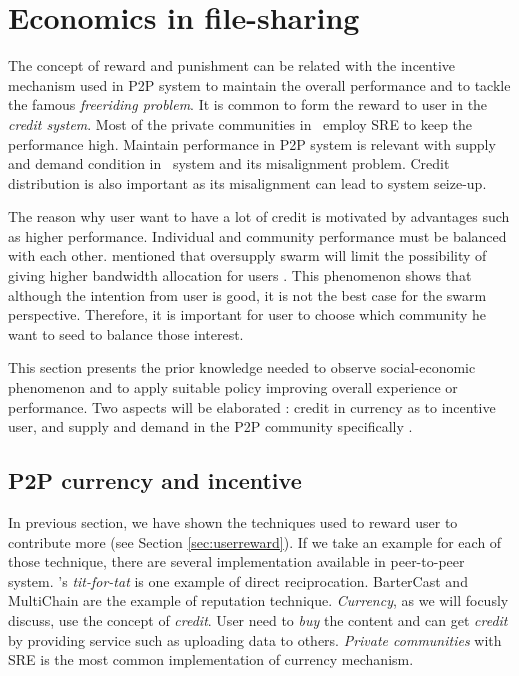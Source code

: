 \section{Economics in file-sharing}
The concept of reward and punishment can be related with the incentive mechanism used in P2P system to maintain the overall performance and to tackle the famous \textit{freeriding problem}. It is common to form the reward to user in the \textit{credit system}. Most of the private communities in \bt~employ SRE to keep the performance high. Maintain performance in P2P system is relevant with supply and demand condition in \bt~system and its misalignment problem. Credit distribution is also important as its misalignment can lead to system seize-up.

The reason why user want to have a lot of credit is motivated by advantages such as higher performance. Individual and community performance must be balanced with each other. \citeauthor{2013:survivepriv:jia} mentioned that oversupply swarm will limit the possibility of giving higher bandwidth allocation for users \cite{2013:survivepriv:jia}. This phenomenon shows that although the intention from user is good, it is not the best case for the swarm perspective. Therefore, it is important for user to choose which community he want to seed to balance those interest.

This section presents the prior knowledge needed to observe social-economic phenomenon and to apply suitable policy improving overall experience or performance. Two aspects will be elaborated : credit in currency as to incentive user, and supply and demand in the P2P community specifically \bt.

\subsection{P2P currency and incentive}
In previous section, we have shown the techniques used to reward user to contribute more (see Section \ref{sec:userreward}). If we take an example for each of those technique, there are several implementation available in peer-to-peer system. \bt's \textit{tit-for-tat} is one example of direct reciprocation. BarterCast \cite{2009:bartercast:meulpolder} and MultiChain \cite{2015:multichain:norberhuis} are the example of reputation technique. \textit{Currency}, as we will focusly discuss, use the concept of \textit{credit}. User need to \textit{buy} the content and can get \textit{credit} by providing service such as uploading data to others. \textit{Private communities} with SRE is the most common implementation of currency mechanism.

